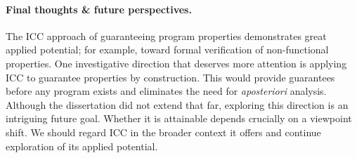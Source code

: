 \paragraph*{Final thoughts \& future perspectives.}
The ICC approach of guaranteeing program properties demonstrates great applied potential;
for example, toward formal verification of non-functional properties.
One investigative direction that deserves more attention is applying ICC to guarantee properties by construction.
This would provide guarantees before any program exists and eliminates the need for \emph{aposteriori} analysis.
Although the dissertation did not extend that far, exploring this direction is an intriguing future goal.
Whether it is attainable depends crucially on a viewpoint shift.
We should regard ICC in the broader context it offers and continue exploration of its applied potential.
